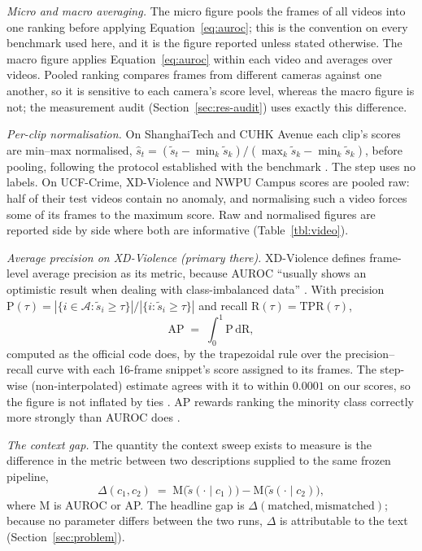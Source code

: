 \documentclass[a4paper,fleqn]{cas-sc}
\begin{document}
\emph{Micro and macro averaging.} The micro figure pools the frames of all videos
into one ranking before applying Equation~\eqref{eq:auroc}; this is the
convention on every benchmark used here, and it is the figure reported unless
stated otherwise. The macro figure applies Equation~\eqref{eq:auroc} within each
video and averages over videos. Pooled ranking compares frames from different
cameras against one another, so it is sensitive to each camera's score level,
whereas the macro figure is not; the measurement audit
(Section~\ref{sec:res-audit}) uses exactly this difference.

\emph{Per-clip normalisation.} On ShanghaiTech and CUHK Avenue each clip's
scores are min--max normalised,
$\hat{s}_t = (\tilde{s}_t-\min_k \tilde{s}_k)/(\max_k \tilde{s}_k-\min_k \tilde{s}_k)$,
before pooling, following the protocol established with the benchmark
\citep{liu2018shanghaitech}. The step uses no labels. On UCF-Crime, XD-Violence
and NWPU Campus scores are pooled raw: half of their test videos contain no
anomaly, and normalising such a video forces some of its frames to the maximum
score. Raw and normalised figures are reported side by side where both are
informative (Table~\ref{tbl:video}).

\emph{Average precision on XD-Violence (primary there).} XD-Violence defines
frame-level average precision as its metric, because AUROC ``usually shows an
optimistic result when dealing with class-imbalanced data''
\citep{wu2020xdviolence}. With precision
$\mathrm{P}(\tau)=|\{i\in\mathcal{A}:\tilde{s}_i\ge\tau\}|/|\{i:\tilde{s}_i\ge\tau\}|$
and recall $\mathrm{R}(\tau)=\mathrm{TPR}(\tau)$,
\begin{equation}
\mathrm{AP} \;=\; \int_{0}^{1} \mathrm{P}\,\mathrm{d}\mathrm{R},
\label{eq:ap}
\end{equation}
computed as the official code does, by the trapezoidal rule over the
precision--recall curve with each 16-frame snippet's score assigned to its
frames. The step-wise (non-interpolated) estimate agrees with it to within
$0.0001$ on our scores, so the figure is not inflated by ties
\citep{song2026vlmanswer}. AP rewards ranking the minority class correctly more
strongly than AUROC does \citep{davis2006pr}.

\emph{The context gap.} The quantity the context sweep exists to measure is the
difference in the metric between two descriptions supplied to the same frozen
pipeline,
\begin{equation}
\Delta(c_1, c_2) \;=\; \mathrm{M}\big(\tilde{s}(\cdot \mid c_1)\big) -
\mathrm{M}\big(\tilde{s}(\cdot \mid c_2)\big),
\label{eq:gap}
\end{equation}
where $\mathrm{M}$ is AUROC or AP. The headline gap is
$\Delta(\text{matched},\text{mismatched})$; because no parameter differs between
the two runs, $\Delta$ is attributable to the text (Section~\ref{sec:problem}).
\end{document}
